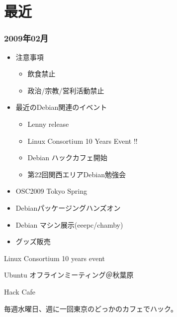 \section{最近}

\begin{frame}
 \frametitle{2009年02月}
\begin{minipage}[t]{0.45\hsize}
  \begin{itemize}
  \item 注意事項
	\begin{itemize}
	 \item 飲食禁止
	 \item 政治/宗教/営利活動禁止
	\end{itemize}
  \item 最近のDebian関連のイベント
	\begin{itemize}
	 \item Lenny release
	 \item Linux Consortium 10 Years Event !!
	 \item Debian ハックカフェ開始
	 \item 第22回関西エリアDebian勉強会
	\end{itemize}
 \end{itemize}
\end{minipage} 
\begin{minipage}[t]{0.45\hsize}
	\begin{itemize}
	 \item OSC2009 Tokyo Spring
	 \item Debianパッケージングハンズオン
	 \item Debian マシン展示(eeepc/chamby)
	 \item グッズ販売
	\end{itemize}
\end{minipage}
\end{frame}

\begin{frame}{Linux Consortium 10 years event}
 
\end{frame}

\begin{frame}{Ubuntu オフラインミーティング＠秋葉原}
 
\end{frame}

\begin{frame}{Hack Cafe}

毎週水曜日、週に一回東京のどっかのカフェでハック。

\end{frame}

